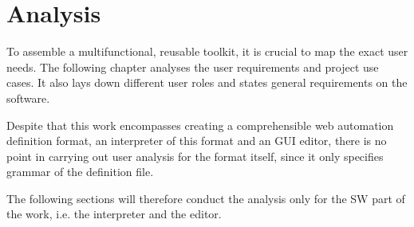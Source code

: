\chapter{Analysis}

To assemble a multifunctional, reusable toolkit, it is crucial to map the exact user needs.
The following chapter analyses the user requirements and project use cases. 
It also lays down different user roles and states general requirements on the software.

Despite that this work encompasses creating a comprehensible web automation definition format, an interpreter of this format and an \ac{GUI} editor, 
there is no point in carrying out user analysis for the format itself, since it only specifies grammar of the definition file. 

The following sections will therefore conduct the analysis only for the \ac{SW} part of the work, i.e. the interpreter and the editor.





